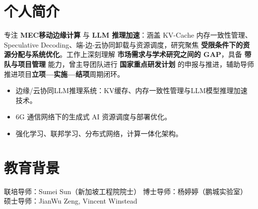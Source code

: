 \documentclass{resume}
\begin{document}





\section{个人简介}
专注 \textbf{MEC移动边缘计算} 与 \textbf{LLM 推理加速}：涵盖 KV-Cache 内存一致性管理、Speculative Decoding、端-边-云协同卸载与资源调度，研究聚焦 \textbf{受限条件下的资源分配与系统优化}。工作上深刻理解 \textbf{市场需求与学术研究之间的 GAP}，具备 \textbf{带队与项目管理} 能力，曾主导团队进行 \textbf{国家重点研发计划} 的申报与推进，辅助导师推进项目\textbf{立项—实施—结项}周期闭环。
\begin{itemize}[parsep=0.5ex]
  \item 边缘/云协同LLM推理系统：KV缓存、内存一致性管理与LLM模型推理加速技术。
  \item 6G 通信网络下的生成式 AI 资源调度与部署优化。
  \item 强化学习、联邦学习、分布式网络，计算一体化架构。
\end{itemize}
\vspace{3mm}
\section{教育背景}
联培导师：Sumei Sun（新加坡工程院院士）
博士导师：杨婷婷（鹏城实验室）
硕士导师：JianWu Zeng, Vincent Winstead
\vspace{3mm}
\end{document}
